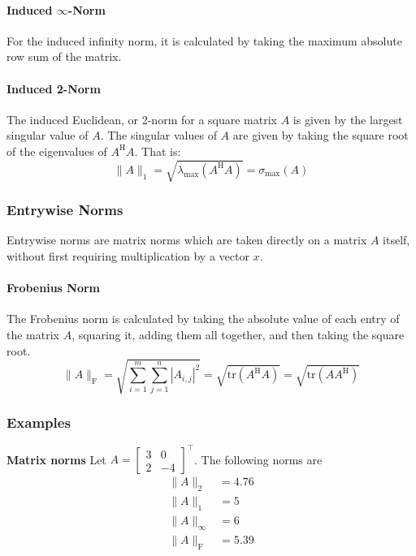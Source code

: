 \paragraph{Induced $\infty$-Norm}
For the induced infinity norm, it is calculated by taking the maximum absolute row sum of the matrix.

\paragraph{Induced 2-Norm}
The induced Euclidean, or 2-norm for a square matrix $A$ is given by the largest singular value of $A$.
The singular values of $A$ are given by taking the square root of the eigenvalues of $A^{\text{H}}A$.
That is:
\begin{equation*}
\|A\|_{1}=\sqrt{\lambda_{\max}(A^{\text{H}}A)}=\sigma_{\max}(A)
\end{equation*}

\subsubsection{Entrywise Norms}
Entrywise norms are matrix norms which are taken directly on a matrix $A$ itself, without first requiring multiplication by a vector $x$.

\paragraph{Frobenius Norm}
The Frobenius norm is calculated by taking the absolute value of each entry of the matrix $A$, squaring it, adding them all together, and then taking the square root.
\begin{equation*}
\|A\|_{\text{F}}=\sqrt{\sum_{i=1}^{m}\sum_{j=1}^{n}|A_{i,j}|^{2}}=\sqrt{\text{tr}(A^{\text{H}}A)}=\sqrt{\text{tr}(AA^{\text{H}})}
\end{equation*}

\subsubsection{Examples}

\begin{example}
\textbf{Matrix norms}
Let $A=\begin{bmatrix} 3 & 0 \\ 2 & -4 \end{bmatrix}^{\top}$.
The following norms are
\begin{equation*}
\begin{split}
\|A\|_{2}&=4.76 \\
\|A\|_{1}&=5 \\
\|A\|_{\infty}&=6 \\
\|A\|_{\text{F}}&=5.39
\end{split}
\end{equation*}
\end{example}


